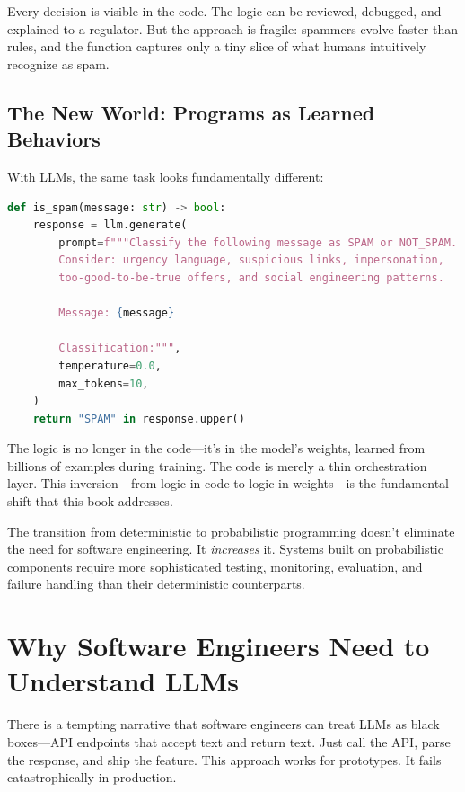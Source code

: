 Every decision is visible in the code. The logic can be reviewed, debugged, and explained to a regulator. But the approach is fragile: spammers evolve faster than rules, and the function captures only a tiny slice of what humans intuitively recognize as spam.

\subsection{The New World: Programs as Learned Behaviors}

With LLMs, the same task looks fundamentally different:

\begin{lstlisting}[language=Python, caption={LLM-powered spam detection}]
def is_spam(message: str) -> bool:
    response = llm.generate(
        prompt=f"""Classify the following message as SPAM or NOT_SPAM.
        Consider: urgency language, suspicious links, impersonation,
        too-good-to-be-true offers, and social engineering patterns.
        
        Message: {message}
        
        Classification:""",
        temperature=0.0,
        max_tokens=10,
    )
    return "SPAM" in response.upper()
\end{lstlisting}

The logic is no longer in the code---it's in the model's weights, learned from billions of examples during training. The code is merely a thin orchestration layer. This inversion---from logic-in-code to logic-in-weights---is the fundamental shift that this book addresses.

\begin{keytakeaway}
The transition from deterministic to probabilistic programming doesn't eliminate the need for software engineering. It \emph{increases} it. Systems built on probabilistic components require more sophisticated testing, monitoring, evaluation, and failure handling than their deterministic counterparts.
\end{keytakeaway}

\section{Why Software Engineers Need to Understand LLMs}

There is a tempting narrative that software engineers can treat LLMs as black boxes---API endpoints that accept text and return text. Just call the API, parse the response, and ship the feature. This approach works for prototypes. It fails catastrophically in production.

